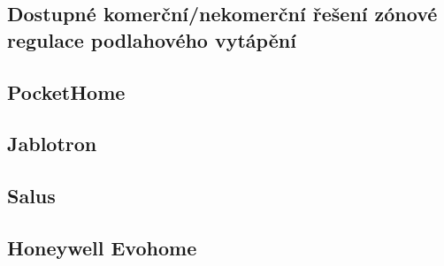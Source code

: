 \subsection{Dostupné komerční/nekomerční řešení zónové regulace podlahového vytápění}
\subsection{PocketHome}
\subsection{Jablotron}
\subsection{Salus}
\subsection{Honeywell Evohome}







